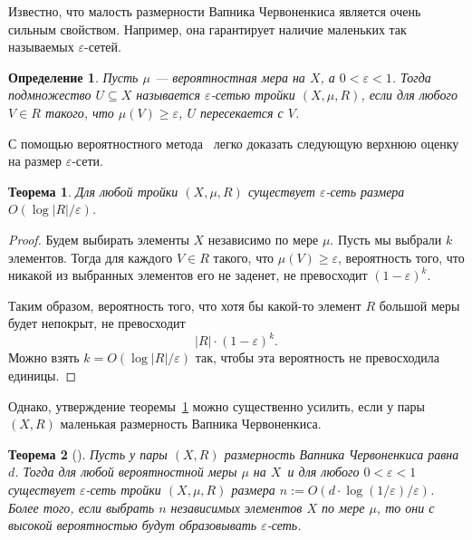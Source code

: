 \documentclass[12pt]{article}
\newcommand{\eps}{\varepsilon}
\DeclareRobustCommand*{\CC}{\,\textendash\,\hskip 0pt}
\newtheorem{definition}{Определение}
\newtheorem{theorem}{Теорема}
\begin{document}
    Известно, что малость размерности Вапника\CC Червоненкиса является очень сильным свойством. Например, она гарантирует
    наличие маленьких так называемых $\varepsilon$-сетей.

    \begin{definition}
        Пусть $\mu$ --- вероятностная мера на $X$, а $0 < \varepsilon < 1$.
        Тогда подмножество $U \subseteq X$
        называется \emph{$\varepsilon$-сетью} тройки $(X, \mu, R)$, если для любого
        $V \in R$ такого, что $\mu(V) \geq \varepsilon$, $U$ пересекается с $V$.
    \end{definition}

    С помощью вероятностного метода~\cite{AS92} легко доказать следующую верхнюю оценку на размер
    $\varepsilon$-сети.

    \begin{theorem}
        \label{naive_epsilon_net}
        Для любой тройки $(X, \mu, R)$ существует $\varepsilon$-сеть размера
        $O(\log |R| / \varepsilon)$.
    \end{theorem}
    \begin{proof}
        Будем выбирать элементы $X$ независимо по мере $\mu$.
        Пусть мы выбрали $k$ элементов. Тогда для каждого $V \in R$ такого, что
        $\mu(V) \geq \varepsilon$, вероятность того, что никакой из выбранных элементов
        его не заденет, не превосходит $(1 - \varepsilon)^k$.

        Таким образом, вероятность того, что хотя бы какой-то элемент $R$ большой меры будет
        непокрыт, не превосходит
        $$
            |R| \cdot (1 - \varepsilon)^k.
        $$
        Можно взять $k = O(\log |R| / \varepsilon)$ так, чтобы эта вероятность не превосходила
        единицы.
    \end{proof}

    Однако, утверждение теоремы~\ref{naive_epsilon_net} можно существенно усилить, если у пары $(X, R)$
    маленькая размерность Вапника\CC Червоненкиса.

    \begin{theorem}[\cite{HW86}]
        \label{full_epsilon_net}
        Пусть у пары $(X, R)$ размерность Вапника\CC Червоненкиса равна $d$. Тогда для любой вероятностной меры $\mu$ на $X$\
        и для любого $0 < \varepsilon < 1$ существует $\varepsilon$-сеть тройки $(X, \mu, R)$ размера
        $n := O(d \cdot \log(1 / \varepsilon) / \varepsilon)$.
        Более того, если выбрать $n$ независимых элементов $X$ по мере $\mu$, то они с высокой вероятностью будут
        образовывать $\eps$-сеть.
    \end{theorem}
\end{document}
